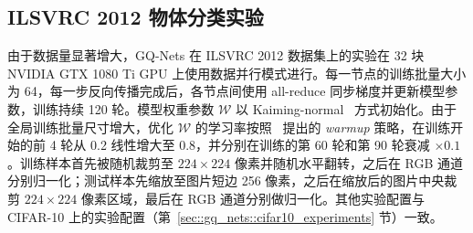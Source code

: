 \documentclass[
  fontset = mac,
]{shtthesis}
\begin{document}
\subsection{ILSVRC 2012 物体分类实验}
由于数据量显著增大，GQ-Nets 在 ILSVRC 2012 数据集上的实验在 32 块 NVIDIA GTX 1080 Ti GPU 上使用数据并行模式进行。每一节点的训练批量大小为 64，每一步反向传播完成后，各节点间使用 all-reduce 同步梯度并更新模型参数，训练持续 120 轮。模型权重参数 $\mathcal{W}$ 以 Kaiming-normal~\citep{He_2015} 方式初始化。由于全局训练批量尺寸增大，优化 $\mathcal{W}$ 的学习率按照~\citet{goyal2017accurate} 提出的 \emph{warmup} 策略，在训练开始的前 4 轮从 0.2 线性增大至 0.8，并分别在训练的第 60 轮和第 90 轮衰减 $\times 0.1$。训练样本首先被随机裁剪至 $224\times 224$ 像素并随机水平翻转，之后在 RGB 通道分别归一化；测试样本先缩放至图片短边 256 像素，之后在缩放后的图片中央裁剪 $224\times 224$ 像素区域，最后在 RGB 通道分别做归一化。其他实验配置与 CIFAR-10 上的实验配置（第~\ref{sec::gq_nets::cifar10_experiments} 节）一致。
\end{document}
